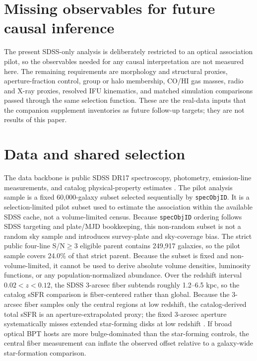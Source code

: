 \documentclass[twocolumn]{aastex631}
\begin{document}
\section{Missing observables for future causal inference}
The present SDSS-only analysis is deliberately restricted to an optical association pilot, so the observables needed for any causal interpretation are not measured here. The remaining requirements are morphology and structural proxies, aperture-fraction control, group or halo membership, CO/HI gas masses, radio and X-ray proxies, resolved IFU kinematics, and matched simulation comparisons passed through the same selection function. These are the real-data inputs that the companion supplement inventories as future follow-up targets; they are not results of this paper.

\section{Data and shared selection}
The data backbone is public SDSS DR17 spectroscopy, photometry, emission-line measurements, and catalog physical-property estimates \citep{york2000,sdssdr17,brinchmann2004}. The pilot analysis sample is a fixed 60,000-galaxy subset selected sequentially by \texttt{specObjID}. It is a selection-limited pilot subset used to estimate the association within the available SDSS cache, not a volume-limited census. Because \texttt{specObjID} ordering follows SDSS targeting and plate/MJD bookkeeping, this non-random subset is not a random sky sample and introduces survey-plate and sky-coverage bias. The strict public four-line S/N$\geq3$ eligible parent contains 249,917 galaxies, so the pilot sample covers 24.0\% of that strict parent. Because the subset is fixed and non-volume-limited, it cannot be used to derive absolute volume densities, luminosity functions, or any population-normalized abundance.
Over the redshift interval $0.02<z<0.12$, the SDSS 3-arcsec fiber subtends roughly 1.2--6.5 kpc, so the catalog sSFR comparison is fiber-centered rather than global.
Because the 3-arcsec fiber samples only the central regions at low redshift, the catalog-derived total sSFR is an aperture-extrapolated proxy; the fixed 3-arcsec aperture systematically misses extended star-forming disks at low redshift \citep{kewley2005}. If broad optical BPT hosts are more bulge-dominated than the star-forming controls, the central fiber measurement can inflate the observed offset relative to a galaxy-wide star-formation comparison.
\end{document}
